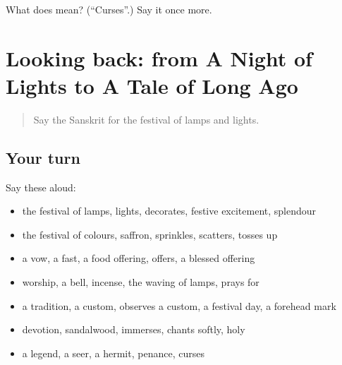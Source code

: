 \begin{tcolorbox}[breakable,colback=teal!4,colframe=teal!35!black,title={Before you move on}]
What does  mean? (\textquotedblleft{}Curses\textquotedblright{}.) Say it once more.
\end{tcolorbox}
\section[(dialogue)]{Looking back: from A Night of Lights to A Tale of Long Ago}

\label{lesson:SA-R332-review-326-332}



\begin{quote}
Say the Sanskrit for the festival of lamps and lights.
\end{quote}

\subsection*{Your turn}
Say these aloud:

\begin{itemize}
\raggedright
  \item the festival of lamps, lights, decorates, festive excitement, splendour
  \item the festival of colours, saffron, sprinkles, scatters, tosses up
  \item a vow, a fast, a food offering, offers, a blessed offering
  \item worship, a bell, incense, the waving of lamps, prays for
  \item a tradition, a custom, observes a custom, a festival day, a forehead mark
  \item devotion, sandalwood, immerses, chants softly, holy
  \item a legend, a seer, a hermit, penance, curses
\end{itemize}

